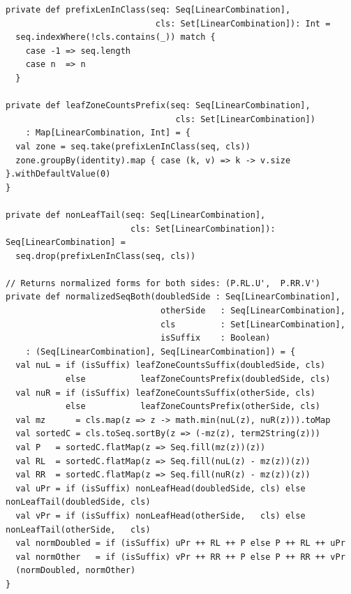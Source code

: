 \documentclass[14pt, russian]{scrartcl}
\begin{document}
\newpage
\begin{listing}[H]
\caption{Методы подсчёта листовых зон и построения нормализованных форм}
\label{lst:norm_helpers}
\begin{verbatim}
private def prefixLenInClass(seq: Seq[LinearCombination],
                              cls: Set[LinearCombination]): Int =
  seq.indexWhere(!cls.contains(_)) match {
    case -1 => seq.length
    case n  => n
  }

private def leafZoneCountsPrefix(seq: Seq[LinearCombination],
                                  cls: Set[LinearCombination])
    : Map[LinearCombination, Int] = {
  val zone = seq.take(prefixLenInClass(seq, cls))
  zone.groupBy(identity).map { case (k, v) => k -> v.size }.withDefaultValue(0)
}

private def nonLeafTail(seq: Seq[LinearCombination],
                         cls: Set[LinearCombination]): Seq[LinearCombination] =
  seq.drop(prefixLenInClass(seq, cls))

// Returns normalized forms for both sides: (P.RL.U',  P.RR.V')
private def normalizedSeqBoth(doubledSide : Seq[LinearCombination],
                               otherSide   : Seq[LinearCombination],
                               cls         : Set[LinearCombination],
                               isSuffix    : Boolean)
    : (Seq[LinearCombination], Seq[LinearCombination]) = {
  val nuL = if (isSuffix) leafZoneCountsSuffix(doubledSide, cls)
            else           leafZoneCountsPrefix(doubledSide, cls)
  val nuR = if (isSuffix) leafZoneCountsSuffix(otherSide, cls)
            else           leafZoneCountsPrefix(otherSide, cls)
  val mz      = cls.map(z => z -> math.min(nuL(z), nuR(z))).toMap
  val sortedC = cls.toSeq.sortBy(z => (-mz(z), term2String(z)))
  val P   = sortedC.flatMap(z => Seq.fill(mz(z))(z))
  val RL  = sortedC.flatMap(z => Seq.fill(nuL(z) - mz(z))(z))
  val RR  = sortedC.flatMap(z => Seq.fill(nuR(z) - mz(z))(z))
  val uPr = if (isSuffix) nonLeafHead(doubledSide, cls) else nonLeafTail(doubledSide, cls)
  val vPr = if (isSuffix) nonLeafHead(otherSide,   cls) else nonLeafTail(otherSide,   cls)
  val normDoubled = if (isSuffix) uPr ++ RL ++ P else P ++ RL ++ uPr
  val normOther   = if (isSuffix) vPr ++ RR ++ P else P ++ RR ++ vPr
  (normDoubled, normOther)
}
\end{verbatim}
\end{listing}
\end{document}
